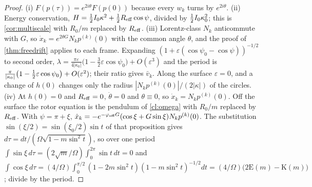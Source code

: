 \begin{proof}
(i) $F(p(\tau))=e^{2i\theta}F(p(0))$ because every $w_k$ turns by $e^{2i\theta}$. (ii) Energy conservation, $H=\tfrac12 I_0\kappa^2+\tfrac12 R_{\rm eff}\cos\psi$, divided
by $\tfrac12 I_0\kappa_0^2$; this is \cref{cor:multiscale} with $R_0/m$ replaced by $R_{\rm eff}$. (iii) Lorentz-class $N_k$ anticommute with $G$, so
$\dot x_k=e^{2\theta G}N_kp^{(k)}(0)$ with the common angle $\theta$, and the proof of \cref{thm:freedrift} applies to each frame. Expanding
$(1+\varepsilon(\cos\psi_0-\cos\psi))^{-1/2}$ to second order,
$\lambda=\frac{\pi\varepsilon}{4|\kappa_0|}\bigl(1-\tfrac32\varepsilon\cos\psi_0\bigr)+O(\varepsilon^3)$ and the period is
$\frac\pi{|\kappa_0|}\bigl(1-\tfrac12\varepsilon\cos\psi_0\bigr)+O(\varepsilon^2)$; their ratio gives $\bar v_k$. Along the surface $\varepsilon=0$, and a change
of $h(0)$ changes only the radius $|N_kp^{(k)}(0)|/(2|\kappa|)$ of the circles. (iv) At $h(0)=0$ and $R_{\rm eff}=0$, $\ddot\theta=0$ and $\theta\equiv0$, so
$\dot x_k=N_kp^{(k)}(0)$. Off the surface the rotor equation is the pendulum of \cref{cl:omega} with $R_0/m$ replaced by $R_{\rm eff}$. With
$\psi=\pi+\xi$, $\dot x_k=-e^{-\varphi_{\rm eff}G}(\cos\xi+G\sin\xi)N_kp^{(k)}(0)$. The substitution $\sin(\xi/2)=\sin(\xi_0/2)\sin t$ of that
proposition gives $d\tau=dt/(\Omega\sqrt{1-m\sin^2t})$, so over one period $\int\sin\xi\,d\tau=(2\sqrt m/\Omega)\int_0^{2\pi}\sin t\,dt=0$ and
$\int\cos\xi\,d\tau=(4/\Omega)\int_0^{\pi/2}(1-2m\sin^2t)(1-m\sin^2t)^{-1/2}dt=(4/\Omega)\bigl(2\mathrm E(m)-\mathrm K(m)\bigr)$; divide by the
period.
\end{proof}

